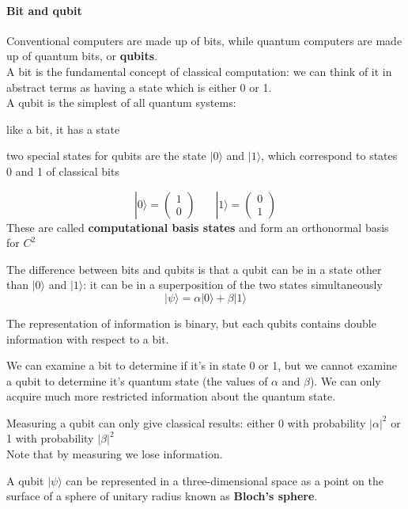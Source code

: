 \documentclass[10pt]{report}
\begin{document}
\paragraph{Bit and qubit} Conventional computers are made up of bits, while quantum computers are made up of quantum bits, or \textbf{qubits}.\\
A bit is the fundamental concept of classical computation: we can think of it in abstract terms as having a state which is either 0 or 1.\\
A qubit is the simplest of all quantum systems:
\begin{list}{}{}
	\item like a bit, it has a state
	\item two special states for qubits are the state $|0\rangle$ and $|1\rangle$, which correspond to states 0 and 1 of classical bits
	
$$|0\rangle = \left(\begin{array}{c}
	1\\0
	\end{array}\right)\:\:\:\:\:\:\:\:|1\rangle = \left(\begin{array}{c}
	0\\1
	\end{array}\right)$$
	These are called \textbf{computational basis states} and form an orthonormal basis for $C^2$
	\item The difference between bits and qubits is that a qubit can be in a state other than $|0\rangle$ and $|1\rangle$: it can be in a superposition of the two states simultaneously
	$$|\psi\rangle = \alpha|0\rangle+\beta|1\rangle$$
	\item The representation of information is binary, but each qubits contains double information with respect to a bit.
	\item We can examine a bit to determine if it's in state 0 or 1, but we cannot examine a qubit to determine it's quantum state (the values of $\alpha$ and $\beta$). We can only acquire much more restricted information about the quantum state.
	\item Measuring a qubit can only give classical results: either 0 with probability $|\alpha|^2$ or 1 with probability $|\beta|^2$\\
	Note that by measuring we lose information.
	\item A qubit $|\psi\rangle$ can be represented in a three-dimensional space as a point on the surface of a sphere of unitary radius known as \textbf{Bloch's sphere}.
\end{list}
\end{document}
